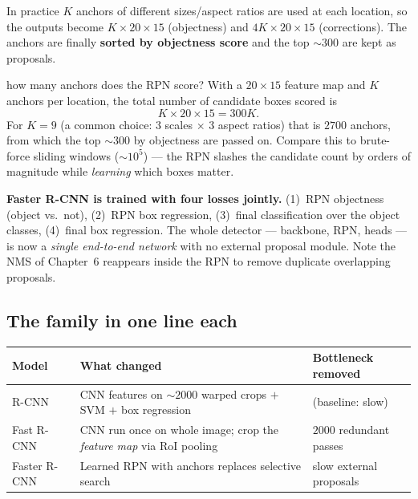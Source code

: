 \documentclass{report}
\begin{document}
In practice $K$ anchors of different sizes/aspect ratios are used at each
location, so the outputs become $K\times20\times15$ (objectness) and
$4K\times20\times15$ (corrections). The anchors are finally \textbf{sorted by
objectness score} and the top $\sim\!300$ are kept as proposals.

\begin{exbox}{how many anchors does the RPN score?}
With a $20\times15$ feature map and $K$ anchors per location, the total number
of candidate boxes scored is
\[
K \times 20 \times 15 = 300K .
\]
For $K=9$ (a common choice: $3$ scales $\times$ $3$ aspect ratios) that is
$2700$ anchors, from which the top $\sim\!300$ by objectness are passed on.
Compare this to brute-force sliding windows ($\sim\!10^5$) --- the RPN slashes
the candidate count by orders of magnitude while \emph{learning} which boxes
matter.
\end{exbox}

\begin{keybox}
\textbf{Faster R-CNN is trained with four losses jointly.} (1)~RPN objectness
(object vs.\ not), (2)~RPN box regression, (3)~final classification over the
object classes, (4)~final box regression. The whole detector --- backbone, RPN,
heads --- is now a \emph{single end-to-end network} with no external proposal
module. Note the NMS of Chapter~6 reappears inside the RPN to remove duplicate
overlapping proposals.
\end{keybox}

\subsection{The family in one line each}
\begin{center}
\renewcommand{\arraystretch}{1.4}
\begin{tabular}{@{}p{2.6cm} p{7.5cm} p{3cm}@{}}
\toprule
\textbf{Model} & \textbf{What changed} & \textbf{Bottleneck removed}\\
\midrule
R-CNN & CNN features on $\sim\!2000$ warped crops $+$ SVM $+$ box regression &
(baseline: slow)\\
Fast R-CNN & CNN run once on whole image; crop the \emph{feature map} via RoI
pooling & $2000$ redundant passes\\
Faster R-CNN & Learned RPN with anchors replaces selective search &
slow external proposals\\
\bottomrule
\end{tabular}
\end{center}
\end{document}
